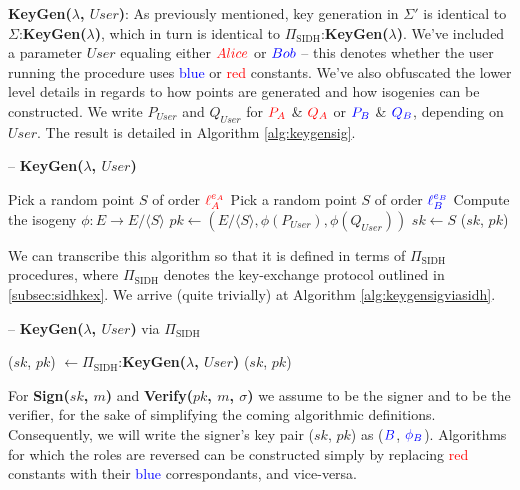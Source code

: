 \noindent
\textbf{KeyGen($\lambda$, $User$)}: As previously mentioned, key generation in $\Sigma'$ is identical to $\Sigma$:\textbf{KeyGen($\lambda$)}, which in turn is identical to $\Pi_{\text{SIDH}}$:\textbf{KeyGen($\lambda$)}. We've included a parameter $User$ equaling either $\textcolor{red}{Alice}$ or $\textcolor{blue}{Bob}$ -- this denotes whether the user running the procedure uses \textcolor{blue}{blue} or \textcolor{red}{red} constants. We've also obfuscated the lower level details in regards to how points are generated and how isogenies can be constructed. We write $P_{User}$ and $Q_{User}$ for $\textcolor{red}{P_A}$ \& $\textcolor{red}{Q_A}$ or $\textcolor{blue}{P_B}$ \& $\textcolor{blue}{Q_B}$, depending on $User$.  The result is detailed in Algorithm \ref{alg:keygensig}.

\begin{algorithm}
\caption{-- \textbf{KeyGen($\lambda$, $User$)}}
\label{alg:keygensig}
\begin{algorithmic}[1]
	\State Pick a random point $S$ of order $\textcolor{red}{\ell_{A}^{e_A}}$
\EndIf
{}
	\State Pick a random point $S$ of order $\textcolor{blue}{\ell_{B}^{e_B}}$
\EndIf
\State Compute the isogeny $\phi: E \rightarrow E/\langle S \rangle$
\State $pk \gets (E/\langle S \rangle, \phi(P_{User}), \phi(Q_{User}))$
\State $sk \gets S$
\State \Return ($sk$, $pk$)
\end{algorithmic}
\end{algorithm}

We can transcribe this algorithm so that it is defined in terms of $\Pi_{\text{SIDH}}$ procedures, where $\Pi_{\text{SIDH}}$ denotes the key-exchange protocol outlined in \ref{subsec:sidhkex}. We arrive (quite trivially) at Algorithm \ref{alg:keygensigviasidh}.\\

\begin{algorithm}
\caption{-- \textbf{KeyGen($\lambda$, $User$)} via $\Pi_{\text{SIDH}}$}
\label{alg:keygensigviasidh}
\begin{algorithmic}[1]
\State ($sk$, $pk$) $\gets \Pi_{\text{SIDH}}$:\textbf{KeyGen($\lambda$, $User$)}
\State \Return ($sk$, $pk$)
\end{algorithmic}
\end{algorithm}

For \textbf{Sign($sk$, $m$)} and \textbf{Verify($pk$, $m$, $\sigma$)} we assume \bob to be the signer and \alice to be the verifier, for the sake of simplifying the coming algorithmic definitions. Consequently, we will write the signer's key pair ($sk$, $pk$) as ($\textcolor{blue}{B}$, $\textcolor{blue}{\phi_B}$). Algorithms for which the roles are reversed can be constructed simply by replacing \textcolor{red}{red} constants with their \textcolor{blue}{blue} correspondants, and vice-versa.\\

